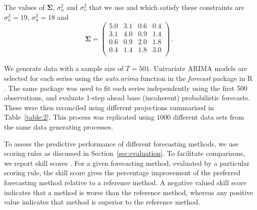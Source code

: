 \documentclass[12pt]{article}
\theoremstyle{definition}
\begin{document}
The values of $\bm{\Sigma}$, $\sigma^2_u$ and $\sigma^2_v$ that we use and which satisfy these constraints are $\sigma^2_u = 19$, $\sigma^2_u = 18$ and
\[
\bm{\Sigma} =
\begin{pmatrix}
5.0 & 3.1 & 0.6 & 0.4 \\
3.1 & 4.0 & 0.9 & 1.4 \\
0.6 & 0.9 & 2.0 & 1.8 \\
0.4 & 1.4 & 1.8 & 3.0 \\
\end{pmatrix}\,.
\]

We generate data with a sample size of $T=501$. Univariate ARIMA models are selected for each series using the \textit{auto.arima} function in the \textit{forecast} package \citep{hyndman2017forecasting} in R \citep{Rcore}. The same package was used to fit each series independently using the first 500 observations, and evaluate 1-step ahead base (incoherent) probabilistic forecasts. These were then reconciled using different projections summarised in Table~\ref{table:2}. This process was replicated using $1000$ different data sets from the same data generating processes.

To assess the predictive performance of different forecasting methods, we use scoring rules as discussed in Section~\ref{sec:evaluation}. To facilitate comparisons, we report skill scores \citep{Gneiting2007}. For a given forecasting method, evaluated by a particular scoring rule, the skill score %
gives the percentage improvement of the preferred forecasting method relative to a reference method. A negative valued skill score indicates that a method is worse than the reference method, whereas any positive value indicates that method is superior to the reference method.
\end{document}
